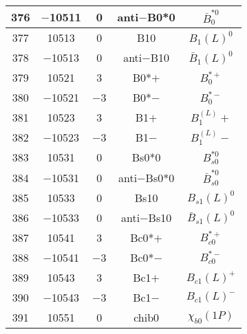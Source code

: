 \documentclass{article}
\begin{document}
\begin{table}[!htbp]
\begin{tabular}{|c|c|c|c|c|}
\hline
376 & $-$10511 & 0 & anti$-$B\underline{\hspace{0.6em}}0*0 & $\bar{B}_{0}^{*0}$ \\
\hline
377 & 10513 & 0 & B\underline{\hspace{0.6em}}10 & $B_{1}(L)^{0}$ \\
\hline
378 & $-$10513 & 0 & anti$-$B\underline{\hspace{0.6em}}10 & $\bar{B}_{1}(L)^{0}$ \\
\hline
379 & 10521 & 3 & B\underline{\hspace{0.6em}}0*$+$ & $B_{0}^{*+}$ \\
\hline
380 & $-$10521 & $-$3 & B\underline{\hspace{0.6em}}0*$-$ & $B_{0}^{*-}$ \\
\hline
381 & 10523 & 3 & B\underline{\hspace{0.6em}}1$+$ & $B_{1}^(L){+}$ \\
\hline
382 & $-$10523 & $-$3 & B\underline{\hspace{0.6em}}1$-$ & $B_{1}^(L){-}$ \\
\hline
383 & 10531 & 0 & B\underline{\hspace{0.6em}}s0*0 & $B_{s0}^{*0}$ \\
\hline
384 & $-$10531 & 0 & anti$-$B\underline{\hspace{0.6em}}s0*0 & $\bar{B}_{s0}^{*0}$ \\
\hline
385 & 10533 & 0 & B\underline{\hspace{0.6em}}s10 & $B_{s1}(L)^{0}$ \\
\hline
386 & $-$10533 & 0 & anti$-$B\underline{\hspace{0.6em}}s10 & $\bar{B}_{s1}(L)^{0}$ \\
\hline
387 & 10541 & 3 & B\underline{\hspace{0.6em}}c0*$+$ & $B_{c0}^{*+}$ \\
\hline
388 & $-$10541 & $-$3 & B\underline{\hspace{0.6em}}c0*$-$ & $B_{c0}^{*-}$ \\
\hline
389 & 10543 & 3 & B\underline{\hspace{0.6em}}c1$+$ & $B_{c1}(L)^{+}$ \\
\hline
390 & $-$10543 & $-$3 & B\underline{\hspace{0.6em}}c1$-$ & $B_{c1}(L)^{-}$ \\
\hline
391 & 10551 & 0 & chi\underline{\hspace{0.6em}}b0 & $\chi_{b0}(1P)$ \\
\hline

\end{tabular}
\end{table}
\end{document}
